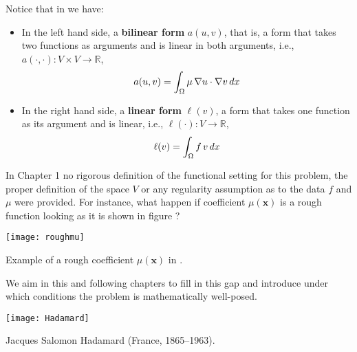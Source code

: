 Notice that in   we have:
\begin{itemize}
\item In the left hand side, a \textbf{bilinear form} $a(u,v)$,
that is, a form that takes two functions as arguments and is linear
in both arguments,
i.e., $a(\cdot,\cdot): V \times V \rightarrow \mathbb{R}$, 
\begin{equation}
       a(u,v) = \int_{\Omega}{\mu\,\nabla{u}\cdot \nabla{v}}\,dx \labeq{poissona}
\end{equation}
\item In the right hand side, a \textbf{linear form} $\ell(v)$,
a form that takes one function as its argument and is linear, i.e.,
$\ell(\cdot): V \rightarrow \mathbb{R}$, 
\begin{equation}
       \ell(v) = \int_{\Omega}{f\, v}\,dx \labeq{poissonl}
\end{equation}
\end{itemize}

In Chapter 1 no rigorous definition of the functional setting for this problem, 
the proper definition of the space $V$ or any regularity assumption
as to the data $f$ and $\mu$ were provided.
For instance, what happen if coefficient $\mu(\mathbf{x})$ is a rough function
looking as it is shown in figure ?
\begin{marginfigure}[-4.0cm]
       \texttt{[image: roughmu]}
       \caption[]{Example of a rough coefficient $\mu(\mathbf{x})$ in .}
\end{marginfigure}
We aim in this and following chapters to fill in this gap and introduce under
which conditions the problem is mathematically well-posed.
\begin{marginfigure}[2.0cm]
       \texttt{[image: Hadamard]}
       \caption[]{Jacques Salomon Hadamard (France, 1865--1963).} 
\end{marginfigure}

